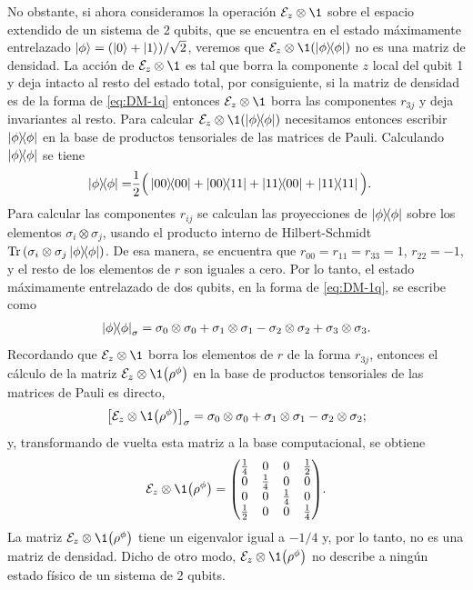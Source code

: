 No obstante, si ahora consideramos la operación $\E_z\otimes\1$ sobre el espacio extendido
de  un sistema de 2 qubits, que se encuentra en el estado máximamente
entrelazado $\ket{\phi}=\qty(\ket{0}+\ket{1})/\sqrt{2}$, veremos 
que $\E_z\otimes\1\qty(\dyad{\phi}{\phi})$  no es una matriz de densidad.
La acción de $\E_z\otimes\1$ es tal que borra la componente
$z$ local del qubit 1 y deja intacto al resto del estado total, por consiguiente,
si la matriz de densidad es de la forma de \eqref{eq:DM-1q} entonces 
$\E_z\otimes\1$ borra las componentes $r_{3j}$ y deja invariantes 
al resto. Para calcular $\E_z\otimes\1\qty(\dyad{\phi}{\phi})$
necesitamos entonces escribir $\dyad{\phi}{\phi}$ en la base
de productos tensoriales de las matrices de Pauli.
Calculando $\dyad{\phi}{\phi}$ se tiene
\begin{align}
\dyad{\phi}{\phi}=& 
\frac{1}{2}
\Big( \dyad{00}{00} + \dyad{00}{11}
+ \dyad{11}{00} + \dyad{11}{11} \Big).
\label{eq:DM-2q-MaxE}
\end{align}
Para calcular las componentes $r_{ij}$ se calculan las
proyecciones de $\dyad{\phi}{\phi}$ sobre
los elementos $\sigma_i\otimes\sigma_j$, usando el producto interno
de Hilbert-Schmidt $\Tr\qty(\pauli{i}{j}\dyad{\phi}{\phi})$.
De esa manera, se encuentra que $r_{00}=r_{11}=r_{33}=1$, $r_{22}=-1$,
y el resto de los elementos de $r$ son iguales a cero. 
Por lo tanto, el estado máximamente entrelazado de
dos qubits, en la forma de \eqref{eq:DM-1q}, se escribe como
\begin{align}
\dyad{\phi}{\phi}_{\sigma}=
\pauli{0}{0}+\pauli{1}{1}-\pauli{2}{2}+\pauli{3}{3}.
\end{align}
Recordando que $\E_z\otimes\1$ borra los elementos de $r$ de la forma
$r_{3j}$, entonces el cálculo de la matriz $\E_z\otimes\1 \qty({\rho}^{\phi})$
en la base de productos tensoriales de las matrices de Pauli es directo,
\begin{align}
\qty[\E_z\otimes\1 \qty({\rho}^{\phi})]_{\sigma}=
\pauli{0}{0}+\pauli{1}{1}-\pauli{2}{2};
\end{align}
y, transformando de vuelta esta matriz a la base computacional,
se obtiene
\begin{align}
\E_z\otimes\1 \qty({\rho}^{\phi})=
\mqty( 
\frac{1}{4} & 0 & 0 & \frac{1}{2} \\
0 & \frac{1}{4} & 0 & 0 \\
0 & 0 & \frac{1}{4} & 0 \\
\frac{1}{2} & 0 & 0 & \frac{1}{4} \\
).
\end{align}
La matriz  $\E_z\otimes\1\qty(\rho^{\phi})$ tiene un 
eigenvalor igual a $-1/4$ y, por lo tanto, no es una matriz de densidad.  
Dicho de otro modo, $\E_z\otimes\1\qty(\rho^{\phi})$ 
no describe a ningún estado físico de un sistema de 2 qubits.

